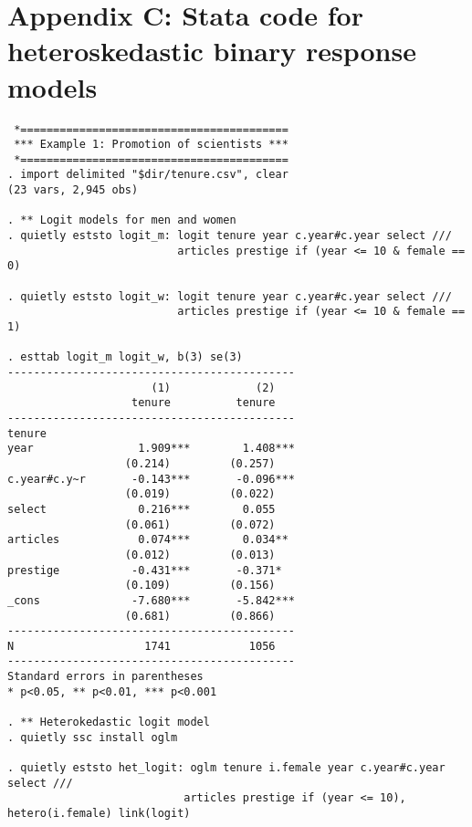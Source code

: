 \hypertarget{appendix-c-stata-code-for-heteroskedastic-binary-response-models}{%
\section{Appendix C: Stata code for heteroskedastic binary response models}\label{appendix-c-stata-code-for-heteroskedastic-binary-response-models}}

\begin{verbatim}
 *=========================================
 *** Example 1: Promotion of scientists ***
 *=========================================
. import delimited "$dir/tenure.csv", clear 
(23 vars, 2,945 obs)

. ** Logit models for men and women
. quietly eststo logit_m: logit tenure year c.year#c.year select ///
                          articles prestige if (year <= 10 & female == 0)

. quietly eststo logit_w: logit tenure year c.year#c.year select ///
                          articles prestige if (year <= 10 & female == 1)

. esttab logit_m logit_w, b(3) se(3)
--------------------------------------------
                      (1)             (2)   
                   tenure          tenure   
--------------------------------------------
tenure                                      
year                1.909***        1.408***
                  (0.214)         (0.257)   
c.year#c.y~r       -0.143***       -0.096***
                  (0.019)         (0.022)   
select              0.216***        0.055   
                  (0.061)         (0.072)   
articles            0.074***        0.034** 
                  (0.012)         (0.013)   
prestige           -0.431***       -0.371*  
                  (0.109)         (0.156)   
_cons              -7.680***       -5.842***
                  (0.681)         (0.866)   
--------------------------------------------
N                    1741            1056   
--------------------------------------------
Standard errors in parentheses
* p<0.05, ** p<0.01, *** p<0.001

. ** Heterokedastic logit model
. quietly ssc install oglm

. quietly eststo het_logit: oglm tenure i.female year c.year#c.year select ///
                           articles prestige if (year <= 10), hetero(i.female) link(logit)


\end{verbatim}
